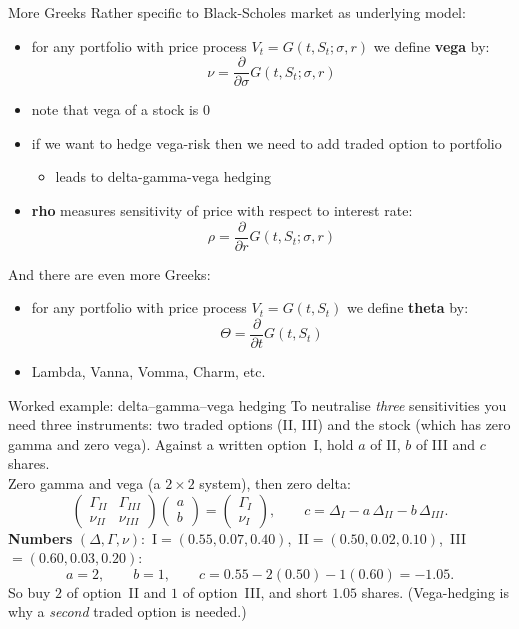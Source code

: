 \documentclass[pdf, handout]{beamer}
\begin{document}
\begin{frame}{More Greeks}
Rather specific to Black-Scholes market as underlying model:
\begin{itemize}
\item for any portfolio with price process $V_t=G(t, S_t;\sigma,r)$ we define \textbf{vega} by:
\[
\nu = \frac{\partial}{\partial \sigma} G(t, S_t;\sigma,r)
\]
\item note that vega of a stock is 0
\item if we want to hedge vega-risk then we need to add traded option to portfolio
\begin{itemize}
\item leads to delta-gamma-vega hedging
\end{itemize}
\item \textbf{rho}  measures sensitivity of price
with respect to interest rate:
\[
\rho = \frac{\partial}{\partial r} G(t, S_t;\sigma,r)
\]
\end{itemize}
And there are even more Greeks:
\begin{itemize}
\item  for any portfolio with price process $V_t=G(t, S_t)$ we define \textbf{theta} by:
\[
\Theta = \frac{\partial}{\partial t} G(t, S_t)
\]
\item Lambda, Vanna, Vomma, Charm, etc.
\end{itemize}
\end{frame}


\begin{frame}{Worked example: delta--gamma--vega hedging}
To neutralise \emph{three} sensitivities you need three instruments: two traded options (II, III) and the stock (which has zero gamma and zero vega). Against a written option~I, hold $a$ of II, $b$ of III and $c$ shares.
\\[2pt]
Zero gamma and vega (a $2\times2$ system), then zero delta:
\[
\begin{pmatrix}\Gamma_{II}&\Gamma_{III}\\ \nu_{II}&\nu_{III}\end{pmatrix}\!\begin{pmatrix}a\\ b\end{pmatrix}=\begin{pmatrix}\Gamma_{I}\\ \nu_{I}\end{pmatrix},\qquad c=\Delta_I-a\,\Delta_{II}-b\,\Delta_{III}.
\]
\textbf{Numbers} $(\Delta,\Gamma,\nu)$:\ I$=(0.55,0.07,0.40)$,\ II$=(0.50,0.02,0.10)$,\ III$=(0.60,0.03,0.20)$:
\[ a=2,\qquad b=1,\qquad c=0.55-2(0.50)-1(0.60)=-1.05 . \]
So buy $2$ of option~II and $1$ of option~III, and short $1.05$ shares. (Vega-hedging is why a \emph{second} traded option is needed.)
\end{frame}
\end{document}
